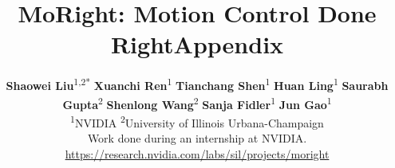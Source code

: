 \documentclass[10pt,logo,copyright]{nvidiatechreport}
\title{MoRight: Motion Control Done Right}
\author{
\textbf{Shaowei Liu}\textsuperscript{1,2*} \quad
\textbf{Xuanchi Ren}\textsuperscript{1} \quad
\textbf{Tianchang Shen}\textsuperscript{1} \quad
\textbf{Huan Ling}\textsuperscript{1} \quad
\textbf{Saurabh Gupta}\textsuperscript{2} \quad
\textbf{Shenlong Wang}\textsuperscript{2} \quad
\textbf{Sanja Fidler}\textsuperscript{1} \quad
\textbf{Jun Gao}\textsuperscript{1} \\

\small \textsuperscript{1}NVIDIA \quad
\textsuperscript{2}University of Illinois Urbana-Champaign \\
\small *Work done during an internship at NVIDIA. \\
{\small
\url{https://research.nvidia.com/labs/sil/projects/moright}}
}
\begin{document}

\maketitle


\abscontent








\renewcommand{\figdir}{supp_src_figs}
\appendix
\clearpage

\title{Appendix}
\author{}
\maketitle
\vspace{-4em}


\clearpage
{
\small


}
\end{document}
